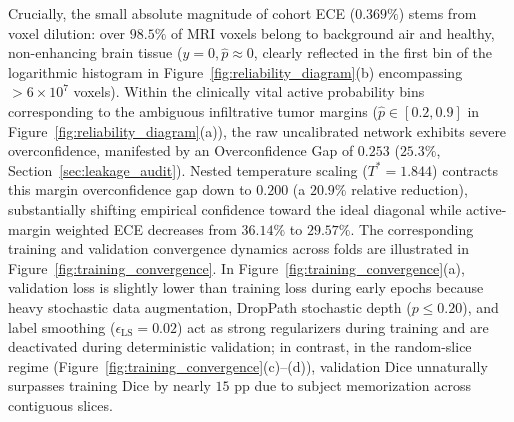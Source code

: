 \documentclass[preprint,12pt,authoryear]{elsarticle}
\begin{document}
Crucially, the small absolute magnitude of cohort ECE ($0.369\%$) stems from voxel dilution: over $98.5\%$ of MRI voxels belong to background air and healthy, non-enhancing brain tissue ($y=0, \hat{p} \approx 0$, clearly reflected in the first bin of the logarithmic histogram in Figure~\ref{fig:reliability_diagram}(b) encompassing $>6 \times 10^7$ voxels). Within the clinically vital active probability bins corresponding to the ambiguous infiltrative tumor margins ($\hat{p} \in [0.2, 0.9]$ in Figure~\ref{fig:reliability_diagram}(a)), the raw uncalibrated network exhibits severe overconfidence, manifested by an Overconfidence Gap of $0.253$ ($25.3\%$, Section~\ref{sec:leakage_audit}). Nested temperature scaling ($T^* = 1.844$) contracts this margin overconfidence gap down to $0.200$ (a $20.9\%$ relative reduction), substantially shifting empirical confidence toward the ideal diagonal while active-margin weighted ECE decreases from $36.14\%$ to $29.57\%$. The corresponding training and validation convergence dynamics across folds are illustrated in Figure~\ref{fig:training_convergence}. In Figure~\ref{fig:training_convergence}(a), validation loss is slightly lower than training loss during early epochs because heavy stochastic data augmentation, DropPath stochastic depth ($p \le 0.20$), and label smoothing ($\epsilon_{\text{LS}} = 0.02$) act as strong regularizers during training and are deactivated during deterministic validation; in contrast, in the random-slice regime (Figure~\ref{fig:training_convergence}(c)--(d)), validation Dice unnaturally surpasses training Dice by nearly $15\text{ pp}$ due to subject memorization across contiguous slices.
\end{document}
